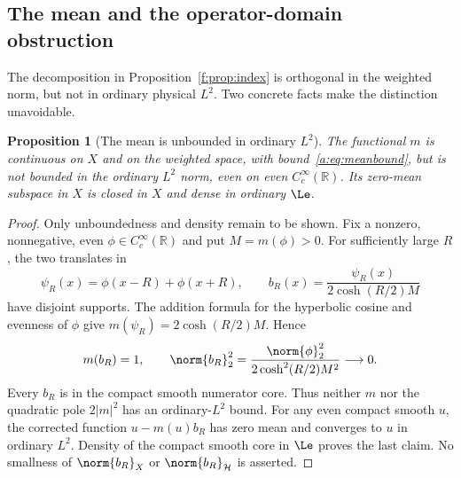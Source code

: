 \documentclass[11pt,a4paper]{article}
\numberwithin{equation}{section}
\newtheorem{proposition}[theorem]{Proposition}
\theoremstyle{definition}\newtheorem{definition}[theorem]{Definition}
\theoremstyle{remark}\newtheorem{remark}[theorem]{Remark}
\newcommand{\R}{\mathbb R}\newcommand{\C}{\mathbb C}\newcommand{\N}{\mathbb N}
\newcommand{\Hh}{\mathcal H}\newcommand{\Hw}{\mathcal H}
\begin{document}
\subsection{The mean and the operator-domain obstruction}\label{f:sec:mean}

The decomposition in Proposition~\ref{f:prop:index} is orthogonal in the weighted norm, but not in ordinary physical $L^2$. Two concrete facts make the distinction unavoidable.

\begin{proposition}[The mean is unbounded in ordinary $L^2$]\label{f:prop:mean}
The functional $m$ is continuous on $X$ and on the weighted space, with bound~\eqref{a:eq:meanbound}, but is not bounded in the ordinary $L^2$ norm, even on even $C_c^\infty(\R)$. Its zero-mean subspace in $X$ is closed in $X$ and dense in ordinary $\Le$.
\end{proposition}
\begin{proof}
Only unboundedness and density remain to be shown. Fix a nonzero, nonnegative, even $\phi\in C_c^\infty(\R)$ and put $M=m(\phi)>0$. For sufficiently large $R$, the two translates in
\[
 \psi_R(x)=\phi(x-R)+\phi(x+R),\qquad
 b_R(x)=\frac{\psi_R(x)}{2\cosh(R/2)M}
\]
have disjoint supports. The addition formula for the hyperbolic cosine and evenness of $\phi$ give $m(\psi_R)=2\cosh(R/2)M$. Hence
\begin{equation}\label{f:eq:unboundedmean}
 m(b_R)=1,\qquad
 \norm{b_R}_2^2=\frac{\norm{\phi}_2^2}{2\cosh^2(R/2)M^2}\longrightarrow0.
\end{equation}
Every $b_R$ is in the compact smooth numerator core. Thus neither $m$ nor the quadratic pole $2|m|^2$ has an ordinary-$L^2$ bound. For any even compact smooth $u$, the corrected function $u-m(u)b_R$ has zero mean and converges to $u$ in ordinary $L^2$. Density of the compact smooth core in $\Le$ proves the last claim. No smallness of $\norm{b_R}_X$ or $\norm{b_R}_{\Hh}$ is asserted.
\end{proof}
\end{document}
